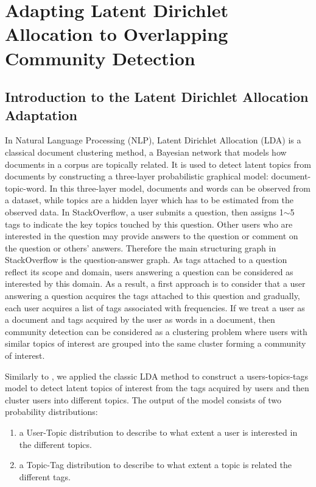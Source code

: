 \chapter{Adapting Latent Dirichlet Allocation to Overlapping Community Detection}
\doublespacing
\label{chap:lda}
\minitoc

\section{Introduction to the Latent Dirichlet Allocation Adaptation}
In Natural Language Processing (NLP), Latent Dirichlet Allocation (LDA) \cite{blei2003latent} is a classical document clustering method, a Bayesian network that models how documents in a corpus are topically related.
It is used to detect latent topics from documents by constructing a three-layer probabilistic graphical model: document-topic-word. In this three-layer model, documents and words can be observed from a dataset, while topics are a hidden layer which has to be estimated from the observed data.  
In StackOverflow, a user submits a question, then assigns 1$\sim$5 tags to indicate the key topics touched by this question. Other users who are interested in the question may provide answers to the question or comment on the question or others' answers. Therefore the main structuring graph in StackOverflow is the question-answer graph. As tags attached to a question  reflect its scope and domain, users answering a question can be considered as interested by this domain. As a result, a first approach is to consider that a user answering a question acquires the tags attached to this question and gradually, each user acquires a list of tags associated with frequencies. If we treat a user as a document and tags acquired by the user as words in a document, then community detection can be considered as a clustering problem where users with similar topics of interest are grouped into the same cluster forming a community of interest.

Similarly to \cite{Li:2010:CTM:1871437.1871673}, we applied the classic LDA method to construct a users-topics-tags model to detect latent topics of interest from the tags acquired by users and then cluster users into different topics. The output of the model consists of two probability distributions:
\begin{enumerate}
 \item a User-Topic distribution to describe to what extent a user is interested in the different topics.
 \item a Topic-Tag distribution to describe to what extent a topic is related the different tags.
\end{enumerate}




